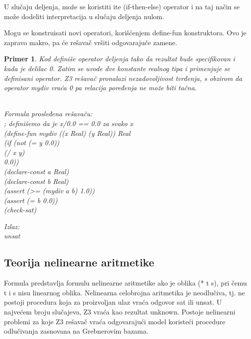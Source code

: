 \documentclass[12pt,oneside]{memoir}
\newtheorem{primer}{Primer}
\begin{document}
U slučaju deljenja, može se koristiti ite (if-then-else) operator i na taj način se može dodeliti interpretacija u slučaju deljenja nulom.
\par
Mogu se konstruisati novi operatori, korišćenjem define-fun konstruktora. Ovo je zapravo makro, pa će rešavač vršiti odgovarajuće zamene.
\begin{primer} Kod definiše operator deljenja tako da rezultat bude specifikovan i kada je delilac 0. Zatim se uvode dve konstante realnog tipa i primenjuje se definisani operator. Z3 rešavač pronalazi nezadovoljivost tvrđenja, s obzirom da operator mydiv vraća 0 pa relacija poređenja ne može biti tačna.\\ \\
\begin{minipage}[b]{0.4\textwidth}
Formula prosleđena rešavaču:
\\; definišemo da je x/0.0 == 0.0 za svako x
\\(define-fun mydiv ((x Real) (y Real)) Real
\\  (if (not (= y 0.0))
\\      (/ x y)
\\      0.0))
\\(declare-const a Real)
\\(declare-const b Real)
\\(assert (>= (mydiv a b) 1.0))
\\(assert (= b 0.0))
\\(check-sat)

\end{minipage}
\hspace{3cm}
\begin{minipage}[t]{0.4\textwidth}
\vspace{-7.85cm}
Izlaz:
\\unsat
\end{minipage}
\end{primer}

\subsection{Teorija nelinearne aritmetike} 

Formula predstavlja formulu nelinearne aritmetike ako je oblika (* t s), pri čemu t i s nisu linearnog oblika.
Nelinearna celobrojna aritmetika je neodlučiva, tj. ne postoji procedura koja za proizvoljan ulaz vraća odgovor sat ili unsat. U najvećem broju slučajeva, Z3 vraća kao rezultat unknown. Postoje nelinearni problemi za koje Z3 rešavač vraća odgovarajući model koristeći procedure odlučivanja zasnovana na Grebnerovim bazama.
\end{document}
